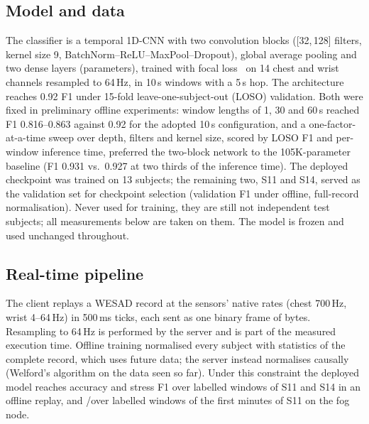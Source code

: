 \documentclass[conference]{IEEEtran}
\begin{document}
\subsection{Model and data}
The classifier is a temporal 1D-CNN with two convolution blocks ([32,\,128]
filters, kernel size 9, BatchNorm--ReLU--MaxPool--Dropout), global average
pooling and two dense layers (\NParams parameters), trained with focal
loss~\cite{lin2017} on 14 chest and wrist channels resampled to 64\,Hz, in
10\,s windows with a 5\,s hop. The architecture reaches 0.92 F1 under
15-fold leave-one-subject-out (LOSO) validation. %
Both were fixed in preliminary offline experiments: window lengths of 1,
30 and 60\,s reached F1 0.816--0.863 against 0.92 for the adopted 10\,s
configuration,
and a one-factor-at-a-time sweep over depth, filters and kernel size,
scored by LOSO F1 and per-window inference time, preferred the two-block
network to the 105K-parameter baseline (F1 0.931 vs.\ 0.927 at two
thirds of the inference time).
The deployed checkpoint was trained on 13 subjects; the remaining two, S11
and S14, served as the validation set for checkpoint selection (validation
F1 \ValFOne under offline, full-record normalisation). Never used for
training, they are still not independent test subjects; all measurements
below are taken on them. The model is frozen and used unchanged throughout.

\subsection{Real-time pipeline}
The client replays a WESAD record at the sensors' native rates (chest
700\,Hz, wrist 4--64\,Hz) in 500\,ms ticks, each sent as one binary frame of
\PayloadBytes bytes. Resampling to 64\,Hz is performed by the server and is
part of the measured execution time. Offline training normalised every
subject with statistics of the complete record, which uses future data;
the server instead normalises causally (Welford's algorithm on the data
seen so far). Under this constraint the deployed model reaches \RtAcc
accuracy and \RtFOne stress F1 over \RtN labelled windows of S11 and S14 in
an offline replay, and \SelAcc/\SelFOne over \SelNLab labelled windows
of the first \SelMinutes minutes of S11 on the fog node.
\end{document}
